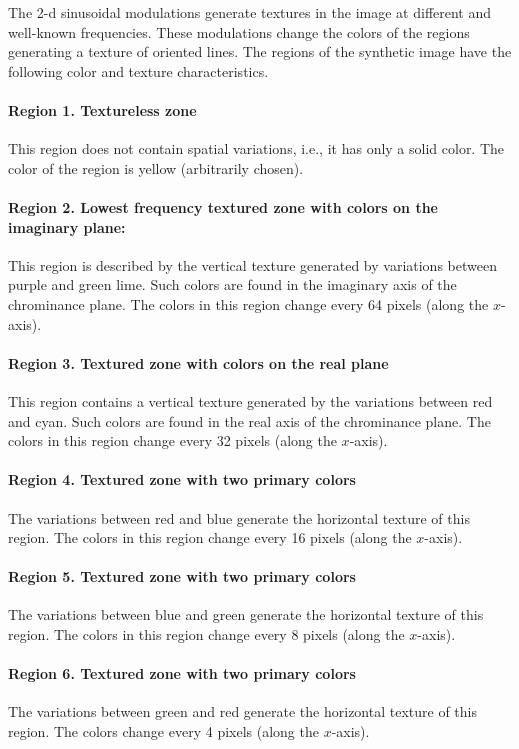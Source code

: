 \documentclass[journal]{IEEEtran}
\begin{document}
The 2-d sinusoidal modulations generate textures in the image at different and well-known frequencies. These modulations change the colors of the regions generating a texture of oriented lines. The regions of the synthetic image have the following color and texture characteristics.

\paragraph{Region 1. Textureless zone}
This region does not contain spatial variations, i.e., it has only a solid color. The color of the region is yellow (arbitrarily chosen).

\paragraph{Region 2. Lowest frequency textured zone with colors on the imaginary plane:}
This region is described by the vertical texture generated by variations between purple and green lime. Such colors are found in the imaginary axis of the chrominance plane. The colors in this region change every 64 pixels (along the $x$-axis).

\paragraph{Region 3. Textured zone with colors on the real plane}
This region contains a vertical texture generated by the variations between red and cyan. Such colors are found in the real axis of the chrominance plane. The colors in this region change every 32 pixels (along the $x$-axis).

\paragraph{Region 4. Textured zone with two primary colors}
The variations between red and blue generate the horizontal texture of this region. The colors in this region change every 16 pixels (along the $x$-axis). 

\paragraph{Region 5. Textured zone with two primary colors}
The variations between blue and green generate the horizontal texture of this region. The colors in this region change every 8 pixels (along the $x$-axis). 

\paragraph{Region 6. Textured zone with two primary colors}
The variations between green and red generate the horizontal texture of this region. The colors change every 4 pixels (along the $x$-axis).
\end{document}
